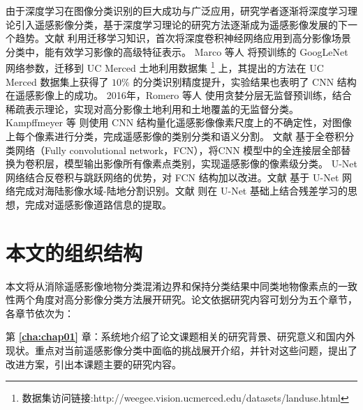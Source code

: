% 

由于深度学习在图像分类识别的巨大成功与广泛应用，研究学者逐渐将深度学习理论引入遥感影像分类，基于深度学习理论的研究方法逐渐成为遥感影像发展的下一个趋势。文献 \cite{hu2015transferring} 利用迁移学习知识，首次将深度卷积神经网络应用到高分影像场景分类中，能有效学习影像的高级特征表示。 Marco 等人 \cite{castelluccio2015land} 将预训练的 GoogLeNet 网络参数，迁移到 UC Merced 土地利用数据集 \footnote{数据集访问链接:http://weegee.vision.ucmerced.edu/datasets/landuse.html} 上，其提出的方法在 UC Merced 数据集上获得了 $10\%$ 的分类识别精度提升，实验结果也表明了 CNN 结构在遥感影像上的成功。 2016年，Romero 等人 \cite{romero2016unsupervised} 使用贪婪分层无监督预训练，结合稀疏表示理论，实现对高分影像土地利用和土地覆盖的无监督分类。 Kampffmeyer 等 \cite{kampffmeyer2016semantic} 则使用 CNN 结构量化遥感影像像素尺度上的不确定性，对图像上每个像素进行分类，完成遥感影像的类别分类和语义分割。 文献 \cite{maggiori2016fully} 基于全卷积分类网络（Fully convolutional network，FCN），将CNN 模型中的全连接层全部替换为卷积层，模型输出影像所有像素点类别，实现遥感影像的像素级分类。 U-Net \cite{ronneberger2015u} 网络结合反卷积与跳跃网络的优势，对 FCN 结构加以改进。文献 \cite{li2018deepunet} 基于 U-Net 网络完成对海陆影像水域-陆地分割识别。文献 \cite{zhang2018road} 则在 U-Net 基础上结合残差学习的思想，完成对遥感影像道路信息的提取。



\section{本文的组织结构}
\label{sec:third}
本文将从消除遥感影像地物分类混淆边界和保持分类结果中同类地物像素点的一致性两个角度对高分影像分类方法展开研究。论文依据研究内容可划分为五个章节，各章节依次为：

第 \textbf{\ref{cha:chap01}} 章：系统地介绍了论文课题相关的研究背景、研究意义和国内外现状。重点对当前遥感影像分类中面临的挑战展开介绍，并针对这些问题，提出了改进方案，引出本课题主要的研究内容。


